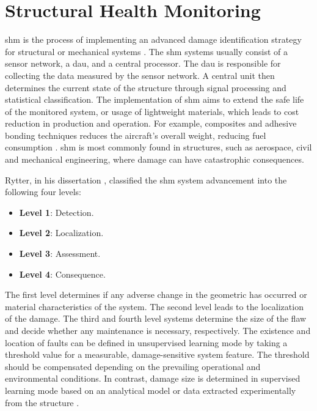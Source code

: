 \section{Structural Health Monitoring}
\label{sec:scm}

\Ac{shm} is the process of implementing an advanced damage identification strategy for structural or mechanical systems \cite{farrar2007introduction}.
The \ac{shm} systems usually consist of a sensor network, a \ac{dau}, and a central processor.
The \ac{dau} is responsible for collecting the data measured by the sensor network.
A central unit then determines the current state of the structure through signal processing and statistical classification.
The implementation of \ac{shm} aims to extend the safe life of the monitored system, or usage of lightweight materials, which leads to cost reduction in production and operation.
For example, composites and adhesive bonding techniques reduces the aircraft's overall weight, reducing fuel consumption \cite{scelsi2011potential}.
\ac{shm} is most commonly found in structures, such as aerospace, civil and mechanical engineering, where damage can have catastrophic consequences.

Rytter, in his dissertation \cite{rytter1993vibrational}, classified the \ac{shm} system advancement into the following four levels:
\begin{itemize}
	\item[] \textbf{Level 1}: Detection.
	\item[] \textbf{Level 2}: Localization.
	\item[] \textbf{Level 3}: Assessment.
	\item[] \textbf{Level 4}: Consequence.
\end{itemize}
The first level determines if any adverse change in the geometric has occurred or material characteristics of the system. The second level leads to the localization of the damage.
The third and fourth level systems determine the size of the flaw and decide whether any maintenance is necessary, respectively.
The existence and location of faults can be defined in unsupervised learning mode by taking a threshold value for a measurable, damage-sensitive system feature. The threshold should be compensated depending on the prevailing operational and environmental conditions.
In contrast, damage size is determined in supervised learning mode based on an analytical model or data extracted experimentally from the structure \cite{worden2007fundamental}.
